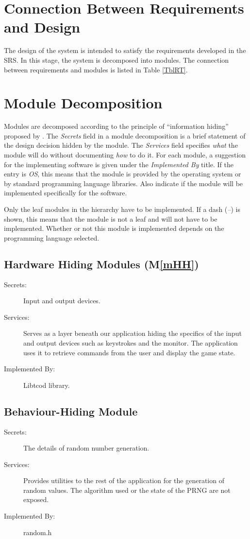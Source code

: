 \documentclass[12pt, titlepage]{article}
\newcommand{\newSection}[1]{
  \newpage
  \section{#1}
}
\newcommand{\mref}[1]{M\ref{#1}}
\begin{document}
\newSection{Connection Between Requirements and Design} \label{SecConnection}

The design of the system is intended to satisfy the requirements developed in
the SRS. In this stage, the system is decomposed into modules. The connection
between requirements and modules is listed in Table \ref{TblRT}.

\newSection{Module Decomposition} \label{SecMD}

Modules are decomposed according to the principle of ``information hiding''
proposed by \citet{ParnasEtAl1984}. The \emph{Secrets} field in a module
decomposition is a brief statement of the design decision hidden by the
module. The \emph{Services} field specifies \emph{what} the module will do
without documenting \emph{how} to do it. For each module, a suggestion for the
implementing software is given under the \emph{Implemented By} title. If the
entry is \emph{OS}, this means that the module is provided by the operating
system or by standard programming language libraries.  Also indicate if the
module will be implemented specifically for the software.

Only the leaf modules in the
hierarchy have to be implemented. If a dash (\emph{--}) is shown, this means
that the module is not a leaf and will not have to be implemented. Whether or
not this module is implemented depends on the programming language
selected.

\subsection{Hardware Hiding Modules (\mref{mHH})}

\begin{description}
\item[Secrets:]Input and output devices.
\item[Services:]Serves as a layer beneath our application hiding the specifics of the
input and output devices such as keystrokes and the monitor. The application uses it
to retrieve commands from the user and display the game state.
\item[Implemented By:] Libtcod library.
\end{description}

\subsection{Behaviour-Hiding Module}

\begin{description}
\item[Secrets:]The details of random number generation.
\item[Services:]Provides utilities to the rest of the application for the generation of random
values. The algorithm used or the state of the PRNG are not exposed.
\item[Implemented By:] random.h
\end{description}
\end{document}
